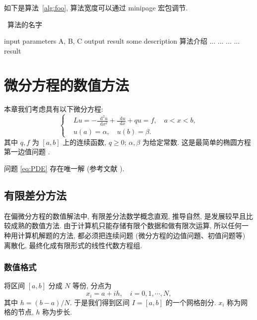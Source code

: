 \documentclass[openany,twoside,12pt]{book}
\theoremstyle{plain}
\newcommand{\dif}{\mathop{}\!\mathrm{d}}
\begin{document}
如下是算法~\ref{alg:foo}, 算法宽度可以通过 minipage 宏包调节.

\begin{center}
\vspace{-2ex}
\begin{minipage}{.9\linewidth}
\begin{algorithm}[H]
\caption{~算法的名字}\label{alg:foo}
\begin{algorithmic}[1]
\Require input parameters A, B, C
\Ensure output result
\State some description 算法介绍
  \State ...
    \State ...
    \Else
    \State ...
  \EndIf
\EndFor
{}
  \State ...
\EndWhile
\State \Return result
\end{algorithmic}
\end{algorithm}
\end{minipage}
\end{center}




\chapter{微分方程的数值方法}

本章我们考虑具有以下微分方程:
\begin{equation}\label{eq:PDE}
\left\{\begin{aligned}
& L u=-\frac{{\dif}^{2} u}{\dif x^{2}}+\frac{\dif u}{\dif x}+q u=f, \quad a < x < b, \\
& u(a)=\alpha, \quad u(b)=\beta.
\end{aligned}\right.
\end{equation}
其中 $q, f$ 为 $[a,b]$ 上的连续函数, $q \geqslant 0$; $\alpha, \beta$ 为给定常数. 这是最简单的椭圆方程第一边值问题 .

问题 \eqref{eq:PDE} 存在唯一解 (参考文献 \cite{LiLiu1997}).


\section{有限差分方法}
在偏微分方程的数值解法中, 有限差分法数学概念直观, 推导自然, 是发展较早且比较成熟的数值方法. 由于计算机只能存储有限个数据和做有限次运算, 所以任何一种用计算机解题的方法, 都必须把连续问题 (微分方程的边值问題、初值问题等) 离散化, 最终化成有限形式的线性代数方程组.

\subsection{数值格式}
将区间 $[a,b]$ 分成 $N$ 等份, 分点为
\begin{equation*}
  x_{i} = a+ih, \quad i=0,1, \cdots, N,
\end{equation*}
其中 $h=(b-a)/N$. 于是我们得到区间 $I=[a,b]$ 的一个网格剖分. $x_i$ 称为网格的节点, $h$ 称为步长.
\end{document}
